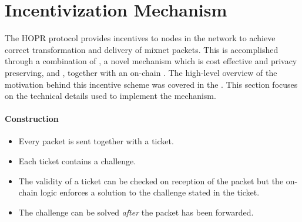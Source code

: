 \section{Incentivization Mechanism}
\label{sec:incentiviationmechanism}

The HOPR protocol provides incentives to nodes in the network to achieve correct transformation and delivery of mixnet packets. This is accomplished through a combination of , a novel mechanism which is cost effective and privacy preserving, and , together with an on-chain . The high-level overview of the motivation behind this incentive scheme was covered in the . This section focuses on the technical details used to implement the mechanism.

\paragraph{Construction}

\begin{itemize}
    \item Every packet is sent together with a ticket.
    \item Each ticket contains a challenge.
    \item The validity of a ticket can be checked on reception of the packet but the on-chain logic enforces a solution to the challenge stated in the ticket.
    \item The challenge can be solved \textit{after} the packet has been forwarded.
\end{itemize}






